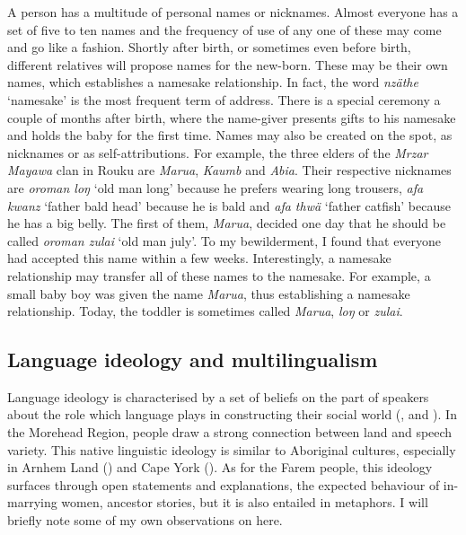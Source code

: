 A person has a multitude of personal names or nicknames. Almost everyone has a set of five to ten names and the frequency of use of any one of these may come and go like a fashion. Shortly after birth, or sometimes even before birth, different relatives will propose names for the new-born. These may be their own names, which establishes a namesake relationship. In fact, the word \emph{nzäthe} `namesake' is the most frequent term of address. There is a special ceremony a couple of months after birth, where the name-giver presents gifts to his namesake and holds the baby for the first time. Names may also be created on the spot, as nicknames or as self-attributions. For example, the three elders of the \emph{Mrzar Mayawa} clan in Rouku are \emph{Marua}, \emph{Kaumb} and \emph{Abia}. Their respective nicknames are \emph{oroman loŋ} `old man long' because he prefers wearing long trousers, \emph{afa kwanz} `father bald head' because he is bald and \emph{afa thwä} `father catfish' because he has a big belly. The first of them, \emph{Marua}, decided one day that he should be called \emph{oroman zulai} `old man july'. To my bewilderment, I found that everyone had accepted this name within a few weeks. Interestingly, a namesake relationship may transfer all of these names to the namesake. For example, a small baby boy was given the name \emph{Marua}, thus establishing a namesake relationship. Today, the toddler is sometimes called \emph{Marua}, \emph{loŋ} or \emph{zulai}.

\subsection{Language ideology and multilingualism}\label{ideomulti}

Language ideology is characterised by a set of beliefs on the part of speakers about the role which language plays in constructing their social world (\citealt{Silverstein:1979li}, \citealt{Rumsey:1990vb} and \citealt{Makihara:2007co}). In the Morehead Region, people draw a strong connection between land and speech variety. This native linguistic ideology is similar to Aboriginal cultures, especially in Arnhem Land (\citealt{Merlan:1981ue}) and Cape York (\citealt{Sutton1978:ws}). As for the Farem people, this ideology surfaces through open statements and explanations, the expected behaviour of in-marrying women, ancestor stories, but it is also entailed in metaphors. I will briefly note some of my own observations on  here.%

